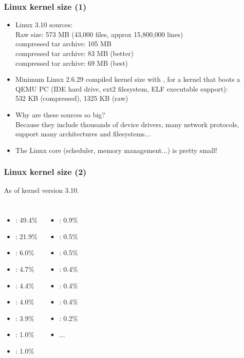 \begin{frame}
  \frametitle{Linux kernel size (1)}
  \begin{itemize}
  \item Linux 3.10 sources:\\
    Raw size: 573 MB (43,000 files, approx 15,800,000 lines)\\
     compressed tar archive: 105 MB\\
     compressed tar archive: 83 MB (better)\\
     compressed tar archive: 69 MB (best)
  \item Minimum Linux 2.6.29 compiled kernel size with
    , for a kernel that boots a QEMU PC (IDE
    hard drive, ext2 filesystem, ELF executable support):\\
    532 KB (compressed), 1325 KB (raw)
  \item Why are these sources so big?\\
    Because they include thousands of device drivers, many network
    protocols, support many architectures and filesystems...
  \item The Linux core (scheduler, memory management...) is pretty
    small!
  \end{itemize}
\end{frame}

\begin{frame}
  \frametitle{Linux kernel size (2)}
  As of kernel version 3.10.
  \begin{columns}
    \begin{itemize}
    \item {}: 49.4\%
    \item {}: 21.9\%
    \item {}: 6.0\%
    \item {}: 4.7\%
    \item {}: 4.4\%
    \item {}: 4.0\%
    \item {}: 3.9\%
    \item {}: 1.0\%
    \item {}: 1.0\%
    \end{itemize}
    \begin{itemize}
    \item {}: 0.9\%
    \item {}: 0.5\%
    \item {}: 0.5\%
    \item {}: 0.4\%
    \item {}: 0.4\%
    \item {}: 0.4\%
    \item {}: 0.2\%
    \item ...
    \end{itemize}
  \end{columns}
\end{frame}
